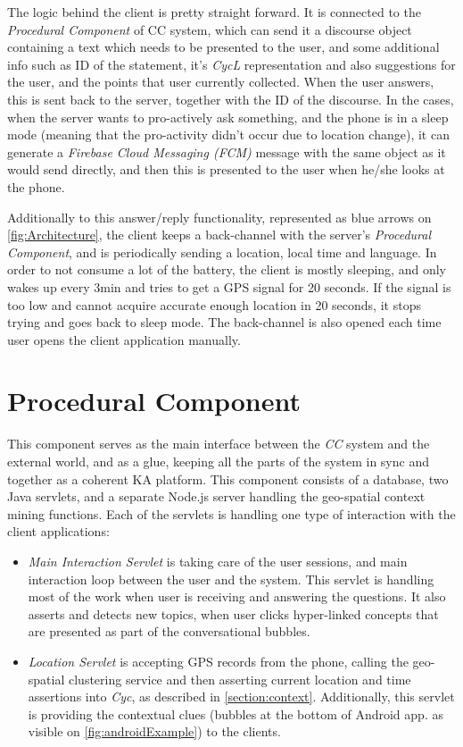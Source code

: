 The logic behind the client is pretty straight forward. It is connected to the
\emph{Procedural Component} of CC system, which can send it a discourse object
containing a text which needs to be presented to the user, and some additional 
info such as ID of the statement, it's \emph{CycL} representation and also
suggestions for the user, and the points that user currently collected. When 
the user answers, this is sent back to the server, together with the ID of the 
discourse. In the cases, when the server wants to pro-actively ask something,
and the phone is in a sleep mode (meaning that the pro-activity didn't occur due
to location change), it can generate a \emph{Firebase Cloud Messaging (FCM)}
message with the same object as
it would send directly, and then this is presented to the user when he/she 
looks at the phone.

Additionally to this answer/reply functionality, represented as blue arrows on
\autoref{fig:Architecture}, the client keeps a back-channel with the 
server's \emph{Procedural Component}, and is periodically sending a location,
local time and language. In order to not consume a lot of the battery, the 
client is mostly sleeping, and only wakes up every 3min and tries to get a GPS
signal for 20 seconds. If the signal is too low and cannot acquire accurate 
enough location in 20 seconds, it stops trying and goes back to sleep mode.
The back-channel is also opened each time user opens the client application
manually.

\section{Procedural Component}
\label{section:prophet}
This component serves as the main interface between the \emph{CC} system and
the external world, and as a glue, keeping all the parts of the system in sync
and together as a coherent KA platform. This component consists of a database,
two Java servlets, and a separate Node.js server handling the geo-spatial 
context mining functions. Each of the servlets is handling one type of 
interaction with the client applications:
\begin{itemize}
\item \emph{Main Interaction Servlet} is taking care of the user sessions, and 
main interaction loop between the user and the system. This servlet is handling
most of the work when user is receiving and answering the questions. It also
asserts and detects new topics, when user clicks hyper-linked concepts that
are presented as part of the conversational bubbles.
\item \emph{Location Servlet} is accepting GPS records from the phone, calling
the geo-spatial clustering service and then asserting current location and 
time assertions into \emph{Cyc}, as described in \autoref{section:context}.
Additionally, this servlet is providing the contextual clues (bubbles at the
bottom of Android app. as visible on \autoref{fig:androidExample}) to the 
clients.
\end{itemize}

